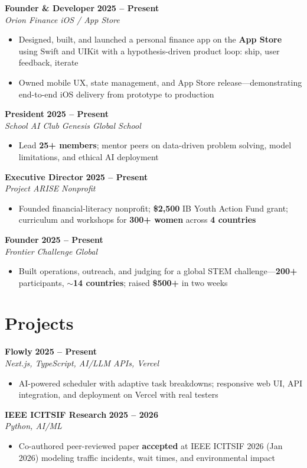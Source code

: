 \documentclass[11pt,letterpaper]{article}
\newcommand{\resumeSubheading}[4]{%
  \vspace{2pt}
  \textbf{#1} \hfill \textbf{#2} \\
  \textit{#3} \hfill \textit{#4} \\
}
\newcommand{\resumeItem}[1]{\item\small{#1}}
\begin{document}
\resumeSubheading{Founder \& Developer}{2025 -- Present}{Orion Finance}{iOS / App Store}
\begin{itemize}[leftmargin=*, nosep, topsep=2pt]
  \resumeItem{Designed, built, and launched a personal finance app on the \textbf{App Store} using Swift and UIKit with a hypothesis-driven product loop: ship, user feedback, iterate}
  \resumeItem{Owned mobile UX, state management, and App Store release---demonstrating end-to-end iOS delivery from prototype to production}
\end{itemize}

\resumeSubheading{President}{2025 -- Present}{School AI Club}{Genesis Global School}
\begin{itemize}[leftmargin=*, nosep, topsep=2pt]
  \resumeItem{Lead \textbf{25+ members}; mentor peers on data-driven problem solving, model limitations, and ethical AI deployment}
\end{itemize}

\resumeSubheading{Executive Director}{2025 -- Present}{Project ARISE}{Nonprofit}
\begin{itemize}[leftmargin=*, nosep, topsep=2pt]
  \resumeItem{Founded financial-literacy nonprofit; \textbf{\$2,500} IB Youth Action Fund grant; curriculum and workshops for \textbf{300+ women} across \textbf{4 countries}}
\end{itemize}

\resumeSubheading{Founder}{2025 -- Present}{Frontier Challenge}{Global}
\begin{itemize}[leftmargin=*, nosep, topsep=2pt]
  \resumeItem{Built operations, outreach, and judging for a global STEM challenge---\textbf{200+} participants, \textbf{$\sim$14 countries}; raised \textbf{\$500+} in two weeks}
\end{itemize}

\section{Projects}

\resumeSubheading{Flowly}{2025 -- Present}{Next.js, TypeScript, AI/LLM APIs, Vercel}{}
\begin{itemize}[leftmargin=*, nosep, topsep=2pt]
  \resumeItem{AI-powered scheduler with adaptive task breakdowns; responsive web UI, API integration, and deployment on Vercel with real testers}
\end{itemize}

\resumeSubheading{IEEE ICITSIF Research}{2025 -- 2026}{Python, AI/ML}{}
\begin{itemize}[leftmargin=*, nosep, topsep=2pt]
  \resumeItem{Co-authored peer-reviewed paper \textbf{accepted} at IEEE ICITSIF 2026 (Jan 2026) modeling traffic incidents, wait times, and environmental impact}
\end{itemize}
\end{document}
